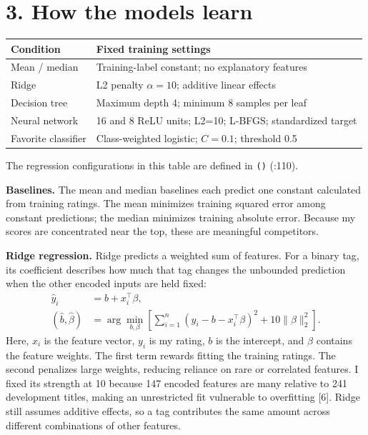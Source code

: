 \documentclass[10pt,a4paper]{article}
\newcommand{\codeptr}[3]{\texttt{\detokenize{#2}()} (\path{#1}:#3)}
\begin{document}
\clearpage

\section*{3. How the models learn}
\begin{center}\small\renewcommand{\arraystretch}{1.35}\begin{tabularx}{\textwidth}{@{}lX@{}}\toprule
\textbf{Condition} & \textbf{Fixed training settings}\\\midrule
Mean / median & Training-label constant; no explanatory features\\
Ridge & L2 penalty \(\alpha=10\); additive linear effects\\
Decision tree & Maximum depth 4; minimum 8 samples per leaf\\
Neural network & 16 and 8 ReLU units; L2=10; L-BFGS; standardized target\\
Favorite classifier & Class-weighted logistic; \(C=0.1\); threshold 0.5\\
\bottomrule\end{tabularx}\end{center}
The regression configurations in this table are defined in \codeptr{src/pipeline.py}{regressors}{110}.

\textbf{Baselines.} The mean and median baselines each predict one constant calculated from training ratings. The mean minimizes training squared error among constant predictions; the median minimizes training absolute error. Because my scores are concentrated near the top, these are meaningful competitors.

\textbf{Ridge regression.} Ridge predicts a weighted sum of features. For a binary tag, its coefficient describes how much that tag changes the unbounded prediction when the other encoded inputs are held fixed:
\[
\begin{aligned}
\hat y_i &= b+x_i^\top\beta,\\
(\hat b,\hat\beta) &= \arg\min_{b,\beta}
\left[\sum_{i=1}^{n}(y_i-b-x_i^\top\beta)^2+10\|\beta\|_2^2\right].
\end{aligned}
\]
Here, \(x_i\) is the feature vector, \(y_i\) is my rating, \(b\) is the intercept, and \(\beta\) contains the feature weights. The first term rewards fitting the training ratings. The second penalizes large weights, reducing reliance on rare or correlated features. I fixed its strength at 10 because 147 encoded features are many relative to 241 development titles, making an unrestricted fit vulnerable to overfitting [6]. Ridge still assumes additive effects, so a tag contributes the same amount across different combinations of other features.
\end{document}

